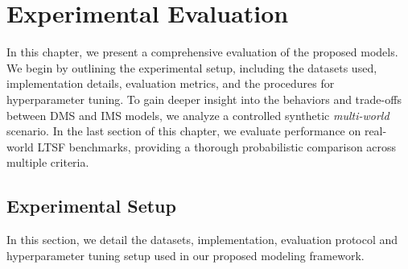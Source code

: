 \documentclass[a4paper,oneside,bibliography=totoc]{scrbook}
\begin{document}
\chapter{Experimental Evaluation}
\label{ch:exp}
In this chapter, we present a comprehensive evaluation of the proposed models. We begin by outlining the experimental setup, including the datasets used, implementation details, evaluation metrics, and the procedures for hyperparameter tuning. To gain deeper insight into the behaviors and trade-offs between DMS and IMS models, we analyze a controlled synthetic \textit{multi-world} scenario. In the last section of this chapter, we evaluate performance on real-world LTSF benchmarks, providing a thorough probabilistic comparison across multiple criteria.

\section{Experimental Setup}
In this section, we detail the datasets, implementation, evaluation protocol and hyperparameter tuning setup used in our proposed modeling framework.
\end{document}
